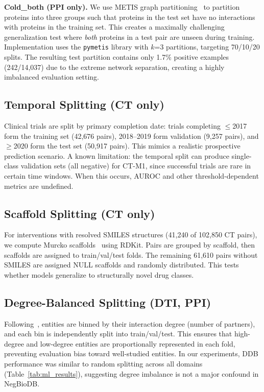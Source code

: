 \textbf{Cold\_both (PPI only).} We use METIS graph partitioning~\citep{karypis1998metis} to partition proteins into three groups such that proteins in the test set have no interactions with proteins in the training set. This creates a maximally challenging generalization test where \emph{both} proteins in a test pair are unseen during training. Implementation uses the \texttt{pymetis} library with $k$=3 partitions, targeting 70/10/20 splits. The resulting test partition contains only 1.7\% positive examples (242/14,037) due to the extreme network separation, creating a highly imbalanced evaluation setting.

\subsection{Temporal Splitting (CT only)}

Clinical trials are split by primary completion date: trials completing $\leq$2017 form the training set (42,676 pairs), 2018--2019 form validation (9,257 pairs), and $\geq$2020 form the test set (50,917 pairs). This mimics a realistic prospective prediction scenario. A known limitation: the temporal split can produce single-class validation sets (all negative) for CT-M1, since successful trials are rare in certain time windows. When this occurs, AUROC and other threshold-dependent metrics are undefined.

\subsection{Scaffold Splitting (CT only)}

For interventions with resolved SMILES structures (41,240 of 102,850 CT pairs), we compute Murcko scaffolds~\citep{bemis1996murcko} using RDKit. Pairs are grouped by scaffold, then scaffolds are assigned to train/val/test folds. The remaining 61,610 pairs without SMILES are assigned NULL scaffolds and randomly distributed. This tests whether models generalize to structurally novel drug classes.

\subsection{Degree-Balanced Splitting (DTI, PPI)}

Following~\citet{zheng2020ddb}, entities are binned by their interaction degree (number of partners), and each bin is independently split into train/val/test. This ensures that high-degree and low-degree entities are proportionally represented in each fold, preventing evaluation bias toward well-studied entities. In our experiments, DDB performance was similar to random splitting across all domains (Table~\ref{tab:ml_results}), suggesting degree imbalance is not a major confound in NegBioDB.

